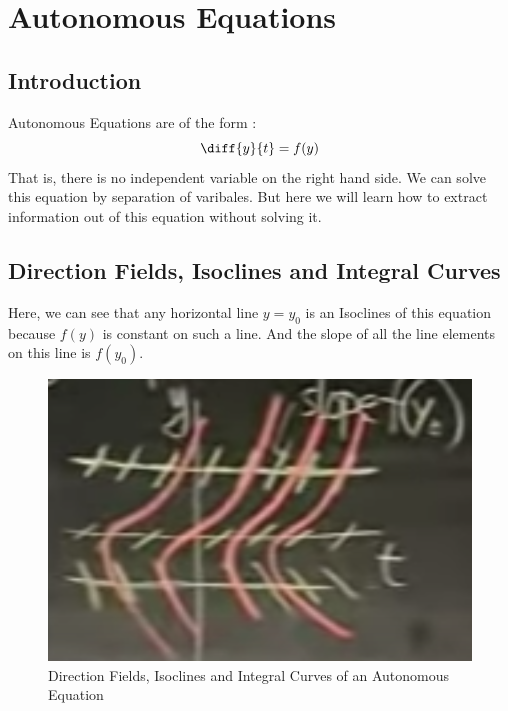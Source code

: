 

\chapter{Autonomous Equations}

\bigbreak

\section{Introduction}

Autonomous Equations are of the form :
$$ \diff{y}{t} = f(y) $$
That is, there is no independent variable on the right hand side.
We can solve this equation by separation of varibales.
But here we will learn how to extract information out of this equation without solving it.

\section{Direction Fields, Isoclines and Integral Curves}

Here, we can see that any horizontal line $y = y_0$ is an Isoclines of this equation because $f(y)$ is constant on such a line.
And the slope of all the line elements on this line is $f(y_0)$.

\begin{figure}[ht!]
	\centering
	\includegraphics[scale=0.5]{./images/lecture_5_figure_1.png}
	\caption{Direction Fields, Isoclines and Integral Curves of an Autonomous Equation}
\end{figure}

